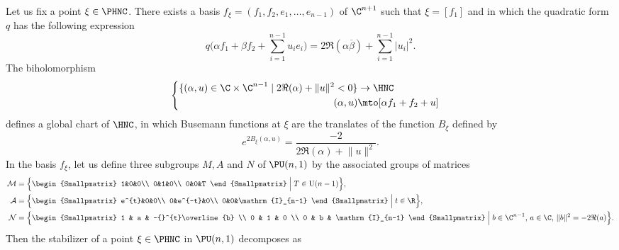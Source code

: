 Let us fix a point $\xi\in\PHNC$. There exists a basis $f_{\xi}=(f_1,f_2,e_1,\dots,e_{n-1})$ of $\C^{n+1}$ such that $\xi=[f_1]$ and in which the quadratic form $q$ has the following expression
\begin{equation*}
q\biggl(\alpha f_1+\beta f_2+\sum_{i=1}^{n-1}u_ie_i\biggr) = 2\Re(\alpha\overline{\beta}) + \sum_{i=1}^{n-1}\lvert u_i\rvert^{2}.
\end{equation*}
The biholomorphism
\begin{equation*}
\begin{cases}\begin{aligned}
\{(\alpha,u)\in \C\times\C^{n-1}\mid 2\Re(\alpha)+\lVert u\rVert^{2}<0\} &\to\HNC\\
(\alpha,u) &\mto [\alpha f_1+f_2+u]
\end{aligned}
\end{cases}
\end{equation*}
defines a global chart of $\HNC$, in which Busemann functions at $\xi$ are the translates of the function $B_{\xi}$ defined by
\begin{equation*}
e^{2B_{\xi}(\alpha,u)}=\frac{-2}{2\Re(\alpha)+\lVert u\rVert^{2}}.
\end{equation*}
In the basis $f_{\xi}$, let us define three subgroups $M,A$ and $N$ of $\PU(n,1)$ by the associated groups of matrices
\begin{align*}
\mathcal{M} &= \arraycolsep3.5pt\Bigl\{\begin{Smallpmatrix}
1&0&0\\
0&1&0\\
0&0&T
\end{Smallpmatrix}
\Bigm| T\in \mathrm{U}(n-1)\Bigr\}, \\
\mathcal{A} &= \arraycolsep3.5pt\Bigl\{\begin{Smallpmatrix}
e^{t}&0&0\\
0&e^{-t}&0\\
0&0&\mathrm{I}_{n-1}
\end{Smallpmatrix}
\Bigm| t\in \R \Bigr\}, \\
\mathcal{N} &=\arraycolsep3.5pt\Bigl\{\begin{Smallpmatrix}
1 & a & -{}^{t}\overline{b} \\
0 & 1 & 0 \\
0 & b & \mathrm{I}_{n-1}
\end{Smallpmatrix}
\Bigm| b\in \C^{n-1},\,a\in \C,\, \lVert b\rVert^{2} = -2\Re(a) \Bigr\}.
\end{align*}
Then the stabilizer of a point $\xi\in \PHNC$ in $\PU(n,1)$ decomposes as
